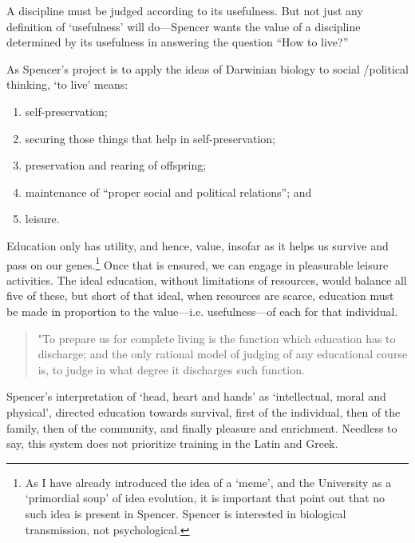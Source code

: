 A discipline must be judged according to its usefulness. But not just any definition of `usefulness' will do---Spencer wants the value of a discipline determined by its usefulness in answering the question ``How to live?'' 

As Spencer's project is to apply the ideas of Darwinian biology to social \slash  political thinking, `to live' means:

\begin{enumerate}
\item self-preservation; 

\item securing those things that help in self-preservation; 

\item preservation and rearing of offspring; 

\item maintenance of ``proper social and political relations''; and 

\item leisure. ~\citep[p. 18]{Spencer:1861ts}

\end{enumerate}

Education only has utility, and hence, value, insofar as it helps us survive and pass on our genes.\footnote{As I have already introduced the idea of a `meme', and the University as a `primordial soup' of idea evolution, it is important that point out that no such idea is present in Spencer. Spencer is interested in biological transmission, not psychological.} Once that is ensured, we can engage in pleasurable leisure activities. The ideal education, without limitations of resources, would balance all five of these, but short of that ideal, when resources are scarce, education must be made in proportion to the value---i.e. usefulness---of each for that individual.

\begin{quote}

"To prepare us for complete living is the function which education has to discharge; and the only rational model of judging of any educational course is, to judge in what degree it discharges such function. ~\citep[p. 16]{Spencer:1861ts}
\end{quote}

Spencer's interpretation of `head, heart and hands' as `intellectual, moral and physical', directed education towards survival, first of the individual, then of the family, then of the community, and finally pleasure and enrichment. Needless to say, this system does not prioritize training in the Latin and Greek.

